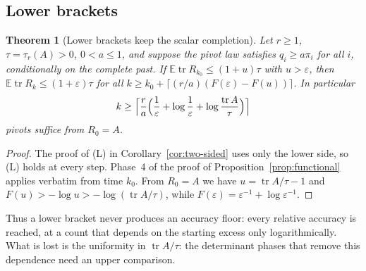 \documentclass[11pt]{article}
\newtheorem{theorem}{Theorem}[section]
\theoremstyle{definition}\newtheorem{definition}[theorem]{Definition}
\theoremstyle{remark}\newtheorem{remark}[theorem]{Remark}
\newcommand{\E}{\mathbb E}
\newcommand{\eps}{\varepsilon}
\newcommand{\tr}{\operatorname{tr}}
\newcommand{\1}{\mathbf 1}
\begin{document}
\subsection{Lower brackets}
\begin{theorem}[Lower brackets keep the scalar completion]\label{thm:lower}
Let $r\ge1$, $\tau=\tau_r(A)>0$, $0<a\le1$, and suppose the pivot law
satisfies $q_i\ge a\pi_i$ for all $i$, conditionally on the complete
past. If $\E\tr R_{k_0}\le(1+u)\tau$ with $u>\eps$, then
$\E\tr R_k\le(1+\eps)\tau$ for all
$k\ge k_0+\lceil(r/a)(F(\eps)-F(u))\rceil$. In particular
\[
 k\ge\Bigl\lceil\frac ra\Bigl(\frac1\eps+\log\frac1\eps
 +\log\frac{\tr A}\tau\Bigr)\Bigr\rceil
\]
pivots suffice from $R_0=A$.
\end{theorem}
\begin{proof}
The proof of (L) in Corollary~\ref{cor:two-sided} uses only the lower
side, so (L) holds at every step. Phase~4 of the proof of
Proposition~\ref{prop:functional} applies verbatim from time $k_0$.
From $R_0=A$ we have $u=\tr A/\tau-1$ and
$F(u)>-\log u>-\log(\tr A/\tau)$, while
$F(\eps)=\eps^{-1}+\log\eps^{-1}$.
\end{proof}

Thus a lower bracket never produces an accuracy floor: every relative
accuracy is reached, at a count that depends on the starting excess only
logarithmically. What is lost is the uniformity in $\tr A/\tau$: the
determinant phases that remove this dependence need an upper comparison.
\end{document}
